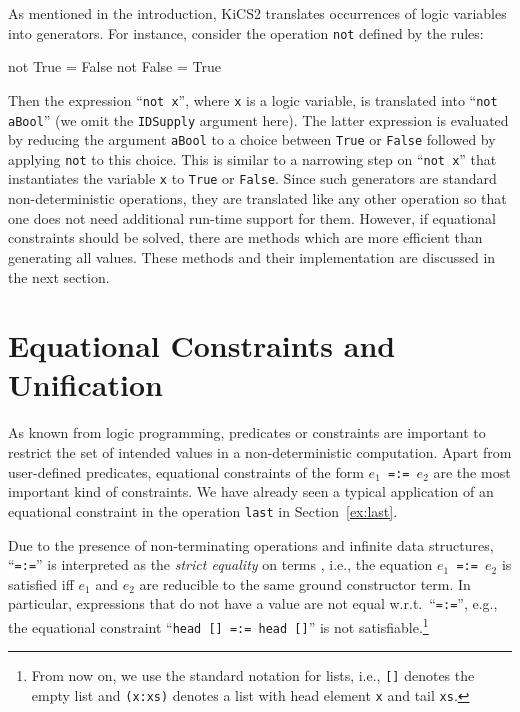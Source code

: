 \documentclass{llncs}
\newcommand{\code}[1]{\mbox{\small\texttt{#1}}}
\newcommand{\ccode}[1]{``\code{#1}''}
\begin{document}
As mentioned in the introduction,
KiCS2 translates occurrences of logic variables
into generators. For instance, consider the operation \code{not}
defined by the rules:
\begin{curry}
  not True  = False
  not False = True
\end{curry}
Then the expression \ccode{not x}, where \code{x} is a logic variable,
is translated into \ccode{not aBool} (we omit the \code{IDSupply} argument
here). The latter expression is evaluated by reducing the
argument \code{aBool} to a choice between \code{True} or \code{False}
followed by applying \code{not} to this choice.
This is similar to a narrowing step on \ccode{not x}
that instantiates the variable \code{x} to \code{True} or \code{False}.
Since such generators are standard
non-deterministic operations, they are translated like any other operation
so that one does not need additional run-time support for them.
However, if equational constraints should be solved,
there are methods which are more efficient than generating all values.
These methods and their implementation are discussed in the
next section.


\section{Equational Constraints and Unification}
\label{sec:Unification}

As known from logic programming, predicates or constraints
are important to restrict the set of intended values
in a non-deterministic computation.
Apart from user-defined predicates,
equational constraints of the form \code{$e_1$\,=:=\,$e_2$}
are the most important kind of constraints.
We have already seen a typical application
of an equational constraint in the operation
\code{last} in Section~\ref{ex:last}.

Due to the presence of non-terminating operations
and infinite data structures,
\ccode{=:=} is interpreted as the \emph{strict equality} on terms
\cite{GiovannettiLeviMoisoPalamidessi91},
i.e., the equation \code{$e_1$\,=:=\,$e_2$} is satisfied iff
$e_1$ and $e_2$ are reducible to the same ground constructor term.
In particular, expressions that do not have a value
are not equal w.r.t.\ \ccode{=:=}, e.g.,
the equational constraint \ccode{head [] =:= head []}
is not satisfiable.\footnote{From now on, we use the
standard notation for lists, i.e., \code{[]} denotes the empty list
and \code{(x:xs)} denotes a list with head element \code{x}
and tail \code{xs}.}
\end{document}
